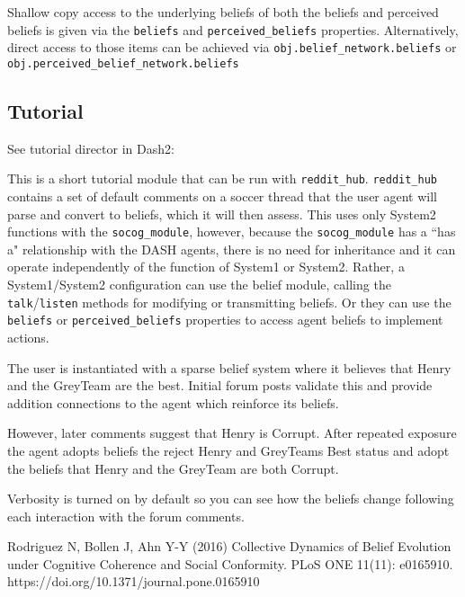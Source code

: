 \documentclass[11pt, a4paper]{article}
\begin{document}
Shallow copy access to the underlying beliefs of both the beliefs and perceived beliefs is given via the \texttt{beliefs} and \texttt{perceived\_beliefs} properties. Alternatively, direct access to those items can be achieved via \texttt{obj.belief\_network.beliefs} or \texttt{obj.perceived\_belief\_network.beliefs}

\subsection{Tutorial}
See tutorial director in Dash2:

This is a short tutorial module that can be run with \texttt{reddit\_hub}.
\texttt{reddit\_hub} contains a set of default comments on a soccer thread that
the user agent will parse and convert to beliefs, which it will then
assess. This uses only System2 functions with the \texttt{socog\_module}, however,
because the \texttt{socog\_module} has a ``has a" relationship with the DASH agents,
there is no need for inheritance and it can operate independently of the
function of System1 or System2. Rather, a System1/System2 configuration
can use the belief module, calling the \texttt{talk}/\texttt{listen} methods for modifying or
transmitting beliefs. Or they can use the \texttt{beliefs} or \texttt{perceived\_beliefs}
properties to access agent beliefs to implement actions.

The user is instantiated with a sparse belief system where it believes that
Henry and the GreyTeam are the best. Initial forum posts validate this and
provide addition connections to the agent which reinforce its beliefs.

However, later comments suggest that Henry is Corrupt. After repeated
exposure the agent adopts beliefs the reject Henry and GreyTeams Best status
and adopt the beliefs that Henry and the GreyTeam are both Corrupt.

Verbosity is turned on by default so you can see how the beliefs change
following each interaction with the forum comments.

\begin{thebibliography}{1}
 Rodriguez N, Bollen J, Ahn Y-Y (2016) Collective Dynamics of Belief Evolution under Cognitive Coherence and Social Conformity. PLoS ONE 11(11): e0165910. https://doi.org/10.1371/journal.pone.0165910
\end{thebibliography}
\end{document}
